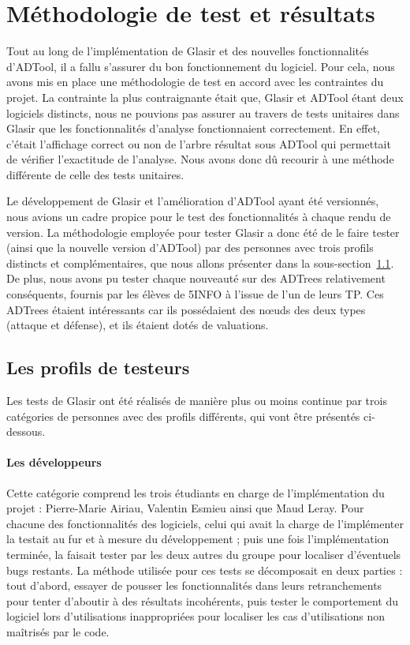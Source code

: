 \section{Méthodologie de test et résultats}
\label{sec:cr_tests}

Tout au long de l'implémentation de Glasir et des nouvelles fonctionnalités d'ADTool, il a fallu s'assurer du bon fonctionnement du logiciel. Pour cela, nous avons mis en place une méthodologie de test en accord avec les contraintes du projet. La contrainte la plus contraignante était que, Glasir et ADTool étant deux logiciels distincts, nous ne pouvions pas assurer au travers de tests unitaires dans Glasir que les fonctionnalités d'analyse fonctionnaient correctement. En effet, c'était l'affichage correct ou non de l'arbre résultat sous ADTool qui permettait de vérifier l'exactitude de l'analyse. Nous avons donc dû recourir à une méthode différente de celle des tests unitaires.

Le développement de Glasir et l'amélioration d'ADTool ayant été versionnés, nous avions un cadre propice pour le test des fonctionnalités à chaque rendu de version. La méthodologie employée pour tester Glasir a donc été de le faire tester (ainsi que la nouvelle version d'ADTool) 
par des personnes avec trois profils distincts et complémentaires, que nous allons présenter dans la {\sc sous-section}~\ref{subsec:testeurs}. De plus, nous avons pu tester chaque nouveauté sur des ADTrees relativement conséquents, fournis par les élèves de 5INFO à l'issue de l'un de leurs TP. Ces ADTrees étaient intéressants car ils possédaient des n\oe{}uds des deux types (attaque et défense), et ils étaient dotés de valuations.

\subsection{Les profils de testeurs}
\label{subsec:testeurs}

Les tests de Glasir ont été réalisés de manière plus ou moins continue par trois catégories de personnes avec des profils différents, qui vont être présentés ci-dessous.

\paragraph{Les développeurs} Cette catégorie comprend les trois étudiants en charge de l'implémentation du projet : Pierre-Marie {\sc Airiau}, Valentin {\sc Esmieu} ainsi que Maud {\sc Leray}. Pour chacune des fonctionnalités des logiciels, celui qui avait la charge de l'implémenter la testait au fur et à mesure du développement ; puis une fois l'implémentation terminée, la faisait tester par les deux autres du groupe pour localiser d'éventuels \og bugs \fg{} restants. La méthode utilisée pour ces tests se décomposait en deux parties : tout d'abord, essayer de pousser les fonctionnalités dans leurs retranchements pour tenter d'aboutir à des résultats incohérents, puis tester le comportement du logiciel lors d'utilisations inappropriées pour localiser les cas d'utilisations non maîtrisés par le code.

